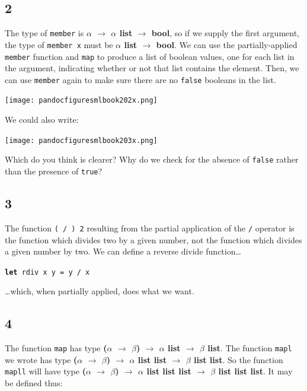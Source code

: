\documentclass[]{book}
\newcommand{\smspace}{\vspace{4mm}}
\begin{document}
\subsection*{2}
The type of \texttt{member} is \textbf{\textsf{$\alpha$ $\rightarrow$ $\alpha$ list $\rightarrow$ bool}}, so if we supply the first argument, the type of \texttt{member\! x} must be \textsf{\textbf{$\alpha$ list $\rightarrow$ bool}}. We can use the partially-applied \texttt{member} function and \texttt{map} to produce a list of boolean values, one for each list in the argument, indicating whether or not that list contains the element. Then, we can use \texttt{member} again to make sure there are no \texttt{false} booleans in the list.

\medskip
\begin{center}
\noindent\texttt{[image: pandocfiguresmlbook202x.png]}
\end{center}
\medskip

\noindent We could also write:

\medskip
\begin{center}
\noindent\texttt{[image: pandocfiguresmlbook203x.png]}
\end{center}
\medskip

\noindent Which do you think is clearer? Why do we check for the absence of \texttt{false} rather than the presence of \texttt{true}?

\subsection*{3}

The function \texttt{( / ) 2} resulting from the partial application of the \texttt{/} operator is the function which divides two by a given number, not the function which divides a given number by two. We can define a reverse divide function\ldots

\smspace
\textbf{\texttt{let}}\texttt{ rdiv x y = y / x}
\smspace

\noindent \ldots which, when partially applied, does what we want.

\subsection*{4}

The function \texttt{map} has type \textbf{\textsf{\textmd{(}$\alpha$ $\rightarrow$ $\beta$\textmd{)} $\rightarrow$ $\alpha$ list $\rightarrow$ $\beta$ list}}. The function \texttt{mapl} we wrote has type \textbf{\textsf{\textmd{(}$\alpha$ $\rightarrow$ $\beta$\textmd{)} $\rightarrow$ $\alpha$ list list $\rightarrow$ $\beta$ list list}}. So the function \texttt{mapll} will have type \textbf{\textsf{\textmd{(}$\alpha$ $\rightarrow$ $\beta$\textmd{)} $\rightarrow$ $\alpha$ list list list $\rightarrow$ $\beta$ list list list}}. It may be defined thus:
\end{document}
